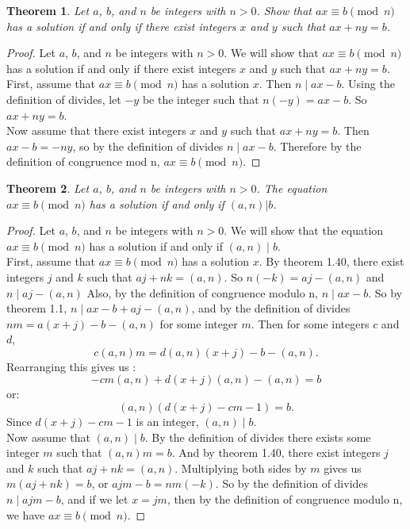 \documentclass[12pt,leqno]{article}
\numberwithin{equation}{section}
\newtheorem{thm}{Theorem}[section]
\theoremstyle{definition}
\begin{document}
\begin{thm}
Let $a$, $b$, and $n$ be integers with $n > 0$.  Show that $ax
\equiv b \pmod{n}$ has a solution if and only if there exist
integers $x$ and $y$ such that $ax + ny = b$.
\end{thm}
\begin{proof}[Proof]
Let $a$, $b$, and $n$ be integers with $n > 0$.  We will show that $ax \equiv b \pmod{n}$ has a solution if and only if there exist integers $x$ and $y$ such that $ax + ny = b$. \\
First, assume that $ax \equiv b \pmod{n}$ has a solution $x$.  Then $n \mid ax - b$.  Using the definition of divides, let $-y$ be the integer such that $n(-y) = ax - b$.  So $ax + ny = b$.\\
Now assume that there exist integers $x$ and $y$ such that $ax + ny = b$.  Then $ax - b = -ny$, so by the definition of divides $n \mid ax - b$.  Therefore by the definition of congruence mod n, $ax \equiv b \pmod{n}$.
\end{proof}

\begin{thm}
Let $a$, $b$, and $n$ be integers with $n > 0$. The equation $ax
\equiv b \pmod{n}$ has a solution if and only if $(a, n)|b$.
\end{thm}

\begin{proof}[Proof]
Let $a$, $b$, and $n$ be integers with $n > 0$. We will show that the equation $ax \equiv b \pmod{n}$ has a solution if and only if $(a, n) \mid b$.\\

First, assume that $ax \equiv b \pmod{n}$ has a solution $x$.  By theorem 1.40, there exist integers $j$ and $k$ such that $aj + nk = (a, n)$.  So $n(-k) = aj - (a, n)$ and $n \mid aj - (a, n)$ Also, by the definition of congruence modulo n, $n \mid ax - b$.  So by theorem 1.1, $n \mid ax - b + aj - (a, n)$, and by the definition of divides $nm = a(x+j) - b - (a, n)$ for some integer $m$.  Then for some integers $c$ and $d$, 
\[c(a, n)m = d(a, n)(x+j) - b - (a, n).\]
Rearranging this gives us :
\[-cm(a, n) + d(x+j)(a, n) - (a, n) = b\]
or:
\[(a, n)(d(x+j) - cm - 1) = b.\]
Since $d(x+j) - cm - 1$ is an integer, $(a, n) \mid b$.\\

Now assume that $(a, n) \mid b$.  By the definition of divides there exists some integer $m$ such that $(a, n)m = b$.  And by theorem 1.40, there exist integers $j$ and $k$ such that $aj + nk = (a, n)$.  Multiplying both sides by $m$ gives us $m(aj + nk) = b$, or $ajm - b = nm(-k)$.  So by the definition of divides $n \mid ajm - b$, and if we let $x = jm$, then by the definition of congruence modulo n, we have $ax \equiv b \pmod{n}$.
\end{proof}
\end{document}
